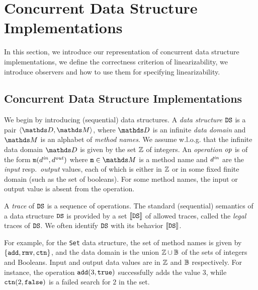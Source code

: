 \section{Concurrent Data Structure Implementations}
\label{programs:section}

In this section, we introduce our representation of
concurrent data structure implementations, we define the correctness criterion of
linearizability, we introduce observers and how to use them for specifying
linearizability.

\subsection{Concurrent Data Structure Implementations}

We begin by introducing (sequential) data structures.
A {\it data structure} ${\tt DS}$ is a pair
$\tuple{\ddomain,\malphabet}$,
where $\ddomain$ is an infinite {\it data domain} and 
$\malphabet$ is an alphabet of {\em method names}.
%
We assume w.l.o.g. that the infinite data domain $\ddomain$ is given by the set 
${\mathbb Z}$ of integers.
%
An {\it operation} 
${\it op}$ is of the form
${\tt m}(d^{\it in},d^{\it out})$ where 
$\mname\in\malphabet$ is a method name and 
$d^{\it in}$ are the {\it input} resp.\ {\it output} values, each of which
is either in ${\mathbb Z}$ or in some fixed finite domain (such as the set of
booleans).
%
For some method names, the input or output value is absent from the operation.

A {\it trace} of ${\tt DS}$ is a sequence of operations.
The standard (sequential) semantics of a data structure ${\tt DS}$ is provided by
a set $\left\llbracket{{\tt DS}}\right\rrbracket$ of allowed traces,
called the {\it legal} traces of ${\tt DS}$.
%
We often identify ${\tt DS}$ with its behavior $\left\llbracket{{\tt DS}}\right\rrbracket$.

For example, for the {\tt Set} data structure, the set of method names
is given by $\left\{{\tt add}, {\tt rmv}, {\tt ctn}\right\}$,
and the data domain is the  union ${\mathbb Z}\cup\mathbb{B}$
of the sets of integers and Booleans.
%
Input and output data values are in ${\mathbb Z}$ and $\mathbb{B}$
respectively.
%
For instance, the operation ${\tt add}(3,{\tt true})$ successfully adds the value
$3$, while ${\tt ctn}(2,{\tt false})$ is a failed search
for $2$ in the set.
%

